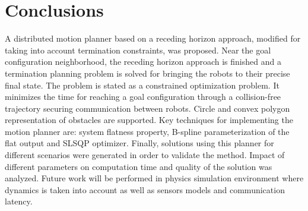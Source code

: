 \documentclass[eprint]{actapoly}
\begin{document}
%

\section{Conclusions}

A distributed motion planner based on a receding horizon approach, modified for taking into account 
termination constraints, was proposed. Near the goal configuration 
neighborhood, the receding horizon approach is finished and a termination planning 
problem is solved for bringing the robots to their precise final state.
The problem is stated as a constrained optimization problem. It minimizes the time 
for reaching a goal configuration through a collision-free trajectory securing communication between robots. Circle and convex polygon representation of obstacles are supported.
Key techniques for implementing the motion planner are: system flatness property, 
B-spline parameterization of the flat output and SLSQP optimizer.
Finally, solutions using this planner for different scenarios were generated in 
order to validate the method. Impact of different parameters on 
computation time and quality of the solution was analyzed.
Future work will be performed in physics simulation environment where dynamics is taken into account as well as sensors models and communication latency.




%




\end{document}
